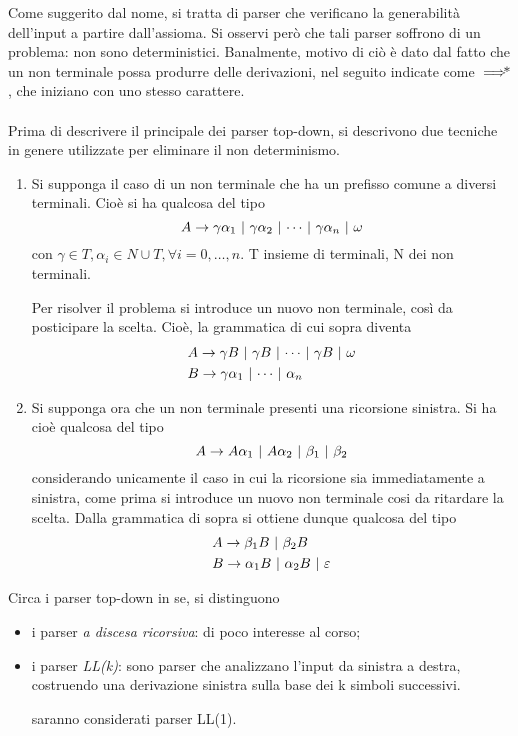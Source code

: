 \documentclass{subfiles}
\begin{document}
Come suggerito dal nome, si tratta di parser che verificano la generabilità dell'input a partire dall'assioma.
Si osservi però che tali parser soffrono di un problema: non sono deterministici.
Banalmente, motivo di ciò è dato dal fatto che un non terminale possa produrre delle derivazioni, nel seguito indicate come \(\operatorname{\implies \hspace{-7.5pt}*}\),
che iniziano con uno stesso carattere.
\\ \\
Prima di descrivere il principale dei parser top-down, si descrivono due tecniche in genere utilizzate per eliminare il non determinismo.
\begin{enumerate}
    \item Si supponga il caso di un non terminale che ha un prefisso comune a diversi terminali.
          Cioè si ha qualcosa del tipo
          \[
              \Grammar{A}{\gamma \alpha_{1}}[\gamma \alpha_{2}, \cdots, \gamma \alpha_{n}, \omega]
          \]
          con \(\gamma \in T, \alpha_{i} \in N \cup T, \forall i = 0, \ldots, n\). T insieme di terminali, N dei non terminali.

          Per risolver il problema si introduce un nuovo non terminale, così da posticipare la scelta.
          Cioè, la grammatica di cui sopra diventa
          \[\begin{aligned}
                   & \Grammar{A}{\gamma B}[\gamma B, \cdots, \gamma B, \omega] \\
                   & \Grammar{B}{\gamma \alpha_{1}}[\cdots, \alpha_{n}]        \\
              \end{aligned}\]
    \item Si supponga ora che un non terminale presenti una ricorsione sinistra.
          Si ha cioè qualcosa del tipo
          \[
              \Grammar{A}{A \alpha_{1}}[A \alpha_{2}, \beta_{1}, \beta_{2}]
          \]
          considerando unicamente il caso in cui la ricorsione sia immediatamente a sinistra,
          come prima si introduce un nuovo non terminale cosi da ritardare la scelta.
          Dalla grammatica di sopra si ottiene dunque qualcosa del tipo
          \[\begin{aligned}
                   & \Grammar{A}{\beta_{1} B}[\beta_{2} B]                \\
                   & \Grammar{B}{\alpha_{1} B}[\alpha_{2} B, \varepsilon] \\
              \end{aligned}\]
\end{enumerate}
Circa i parser top-down in se, si distinguono
\begin{itemize}
    \item i parser \emph{ a discesa ricorsiva}: di poco interesse al corso;
    \item i parser \emph{LL(k)}: sono parser che analizzano l'input da sinistra a destra,
          costruendo una derivazione sinistra sulla base dei k simboli successivi.
          \begin{Note*}
              saranno considerati parser LL(1).
          \end{Note*}
\end{itemize}
\end{document}
